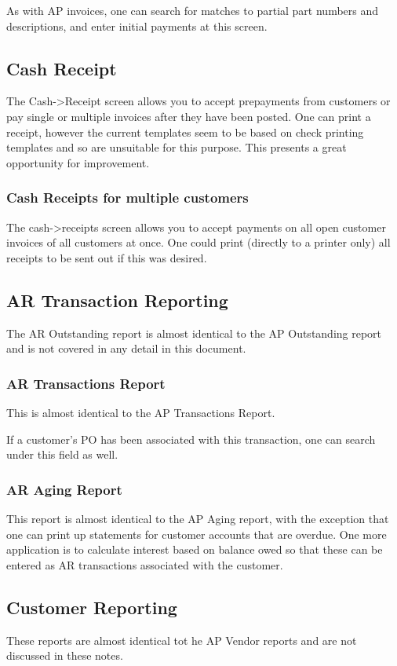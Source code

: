 \documentclass{article}
\begin{document}
As with AP invoices, one can search for matches to partial part numbers and
descriptions, and enter initial payments at this screen.

\subsection{Cash Receipt}
The Cash-\textgreater Receipt screen allows you to accept prepayments from customers or pay
single or multiple invoices after they have been posted.  One can print a
receipt, however the current templates seem to be based on check printing
templates and so are unsuitable for this purpose.  This presents a great
opportunity for improvement.

\subsubsection{Cash Receipts for multiple customers}
The cash-\textgreater receipts screen allows you to accept payments on all open customer
invoices of all customers at once.  One could print (directly to a printer only)
all receipts to be sent out if this was desired.

\subsection{AR Transaction Reporting}

The AR Outstanding report is almost identical to the AP Outstanding report and
is not covered in any detail in this document.

\subsubsection{AR Transactions Report}
This is almost identical to the AP Transactions Report.

If a customer's PO has been associated with this transaction, one can search
under this field as well.

\subsubsection{AR Aging Report}
This report is almost identical to the AP Aging report, with the exception that
one can print up statements for customer accounts that are overdue.  One more
application is to calculate interest based on balance owed so that these can be
entered as AR transactions associated with the customer.

\subsection{Customer Reporting}
These reports are almost identical tot he AP Vendor reports and are not
discussed in these notes.
\end{document}
